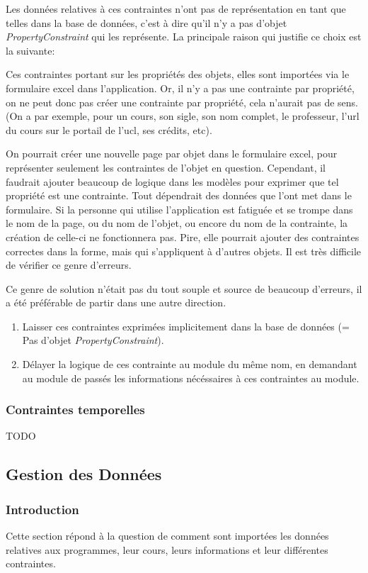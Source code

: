 Les données relatives à ces contraintes n'ont pas de représentation en tant que telles dans la base de données, c'est à dire qu'il n'y a pas d'objet \textit{PropertyConstraint} qui les représente. La principale raison qui justifie ce choix est la suivante:

Ces contraintes portant sur les propriétés des objets, elles sont importées via le formulaire excel dans l'application. Or, il n'y a pas une contrainte par propriété, on ne peut donc pas créer une contrainte par propriété, cela n'aurait pas de sens. (On a par exemple, pour un cours, son sigle, son nom complet, le professeur, l'url du cours sur le portail de l'ucl, ses crédits, etc). 

On pourrait créer une nouvelle page par objet dans le formulaire excel, pour représenter seulement les contraintes de l'objet en question. Cependant, il faudrait ajouter beaucoup de logique dans les modèles pour exprimer que tel propriété est une contrainte. Tout dépendrait des données que l'ont met dans le formulaire. Si la personne qui utilise l'application est fatiguée et se trompe dans le nom de la page, ou du nom de l'objet, ou encore du nom de la contrainte, la création de celle-ci ne fonctionnera pas. Pire, elle pourrait ajouter des contraintes correctes dans la forme, mais qui s'appliquent à d'autres objets. Il est très difficile de vérifier ce genre d'erreurs. 

Ce genre de solution n'était pas du tout souple et source de beaucoup d'erreurs, il a été préférable de partir dans une autre direction. 
\begin{enumerate}
\item Laisser ces contraintes exprimées implicitement dans la base de données (= Pas d'objet \textit{PropertyConstraint}).
\item Délayer la logique de ces contrainte au module du même nom, en demandant au module de passés les informations nécéssaires à ces contraintes au module. 
\end{enumerate} 
\subsubsection{Contraintes temporelles}
TODO
\subsection{Gestion des Données}
\label{gestion_des_données}
\subsubsection{Introduction}
Cette section répond à la question de comment sont importées les données relatives aux programmes, leur cours, leurs informations et leur différentes contraintes. 

